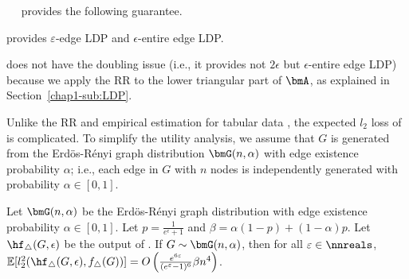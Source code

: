 \smallskip
{}~~ 
provides the following guarantee.

\begin{theorem}\label{chap1-thm:subgraph-rr_LDP}
   provides $\varepsilon$-edge LDP and $\epsilon$-entire edge LDP.
\end{theorem}

 does not have the doubling issue (i.e., it provides not $2\epsilon$ but $\epsilon$-entire edge LDP) because we apply the RR to the lower triangular part of $\bmA$, as explained in Section~\ref{chap1-sub:LDP}.

Unlike the RR and empirical estimation for tabular data \cite{Kairouz_ICML16}, the expected $l_2$ loss of  is complicated. 
To simplify the utility analysis, we assume that $G$ is generated from the Erd\"os-R\'enyi graph distribution $\bmG(n,\alpha)$ with edge existence probability $\alpha$; i.e., each edge in $G$ with $n$ nodes is independently generated with probability $\alpha \in [0,1]$.

\begin{theorem}\label{chap1-thm:subgraph-rr}
  Let $\bmG(n,\alpha)$ be the Erd\"os-R\'enyi graph distribution with edge existence probability $\alpha \in [0,1]$. 
  Let $p = \frac{1}{e^\epsilon+1}$ and 
  $\beta = \alpha(1-p) + (1-\alpha)p$. 
  Let 
  $\hf_{\triangle}(G, \epsilon)$ 
  be the output of 
  .
  If 
  $G \sim \bmG(n,\alpha)$, 
  then for all 
  $\varepsilon \in \nnreals$, 
  $\mathbb{E}[l_2^2(\hf_{\triangle}(G, \epsilon),
  f_\triangle(G))] = 
  O\left(\frac{e^{6\varepsilon}}{(e^\varepsilon-1)^6}\beta n^4\right)$.
\end{theorem}


